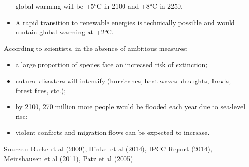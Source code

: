 \documentclass[12pt]{article} %
\begin{document}
\begin{appendices}
\begin{itemize}
global warming will be +5°C in 2100 and +8°C in 2250. 
\item A rapid transition to renewable energies is technically possible and
would contain global warming at +2°C. 
\end{itemize}
According to scientists, in the absence of ambitious measures: 
\begin{itemize}
\item a large proportion of species face an increased risk of extinction;
\item natural disasters will intensify (hurricanes, heat waves, droughts,
floods, forest fires, etc.); 
\item by 2100, 270 million more people would be flooded each year due to
sea-level rise; 
\item violent conflicts and migration flows can be expected to increase. 
\end{itemize}
Sources: \href{http://www.pnas.org/content/106/49/20670}{Burke et al (2009)},
\href{http://www.pnas.org/content/pnas/early/2014/01/29/1222469111.full.pdf}{Hinkel et al (2014)},
\href{http://www.ipcc.ch/report/ar5/syr/}{IPCC Report (2014)}, \href{http://sci-hub.tw/10.1007/s10584-011-0156-z}{Meinshausen et al (2011)},
\href{http://sci-hub.tw/https\%3A/www.nature.com/articles/nature04188}{Patz et al (2005)}


\end{appendices}
\end{document}
